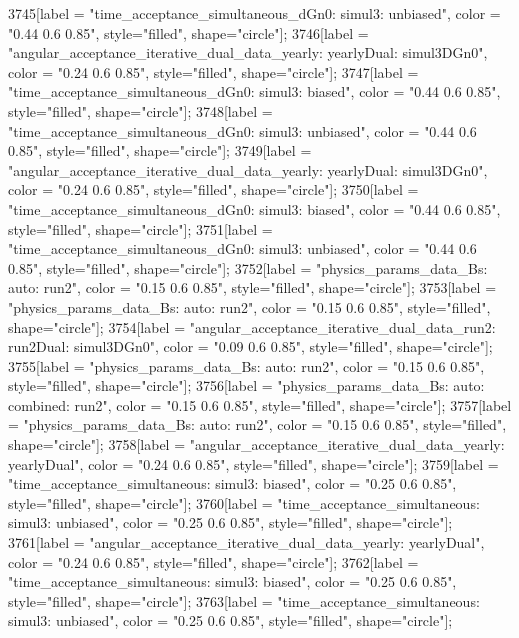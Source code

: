 {	3745[label = "time_acceptance_simultaneous_dGn0\ntimeacc: simul3\ntrigger: unbiased", color = "0.44 0.6 0.85", style="filled", shape="circle"];
	3746[label = "angular_acceptance_iterative_dual_data_yearly\nangacc: yearlyDual\ntimeacc: simul3DGn0", color = "0.24 0.6 0.85", style="filled", shape="circle"];
	3747[label = "time_acceptance_simultaneous_dGn0\ntimeacc: simul3\ntrigger: biased", color = "0.44 0.6 0.85", style="filled", shape="circle"];
	3748[label = "time_acceptance_simultaneous_dGn0\ntimeacc: simul3\ntrigger: unbiased", color = "0.44 0.6 0.85", style="filled", shape="circle"];
	3749[label = "angular_acceptance_iterative_dual_data_yearly\nangacc: yearlyDual\ntimeacc: simul3DGn0", color = "0.24 0.6 0.85", style="filled", shape="circle"];
	3750[label = "time_acceptance_simultaneous_dGn0\ntimeacc: simul3\ntrigger: biased", color = "0.44 0.6 0.85", style="filled", shape="circle"];
	3751[label = "time_acceptance_simultaneous_dGn0\ntimeacc: simul3\ntrigger: unbiased", color = "0.44 0.6 0.85", style="filled", shape="circle"];
	3752[label = "physics_params_data_Bs\nfit: auto\nyear: run2", color = "0.15 0.6 0.85", style="filled", shape="circle"];
	3753[label = "physics_params_data_Bs\nfit: auto\nyear: run2", color = "0.15 0.6 0.85", style="filled", shape="circle"];
	3754[label = "angular_acceptance_iterative_dual_data_run2\nangacc: run2Dual\ntimeacc: simul3DGn0", color = "0.09 0.6 0.85", style="filled", shape="circle"];
	3755[label = "physics_params_data_Bs\nfit: auto\nyear: run2", color = "0.15 0.6 0.85", style="filled", shape="circle"];
	3756[label = "physics_params_data_Bs\nfit: auto\ntrigger: combined\nyear: run2", color = "0.15 0.6 0.85", style="filled", shape="circle"];
	3757[label = "physics_params_data_Bs\nfit: auto\nyear: run2", color = "0.15 0.6 0.85", style="filled", shape="circle"];
	3758[label = "angular_acceptance_iterative_dual_data_yearly\nangacc: yearlyDual", color = "0.24 0.6 0.85", style="filled", shape="circle"];
	3759[label = "time_acceptance_simultaneous\ntimeacc: simul3\ntrigger: biased", color = "0.25 0.6 0.85", style="filled", shape="circle"];
	3760[label = "time_acceptance_simultaneous\ntimeacc: simul3\ntrigger: unbiased", color = "0.25 0.6 0.85", style="filled", shape="circle"];
	3761[label = "angular_acceptance_iterative_dual_data_yearly\nangacc: yearlyDual", color = "0.24 0.6 0.85", style="filled", shape="circle"];
	3762[label = "time_acceptance_simultaneous\ntimeacc: simul3\ntrigger: biased", color = "0.25 0.6 0.85", style="filled", shape="circle"];
	3763[label = "time_acceptance_simultaneous\ntimeacc: simul3\ntrigger: unbiased", color = "0.25 0.6 0.85", style="filled", shape="circle"];
}
